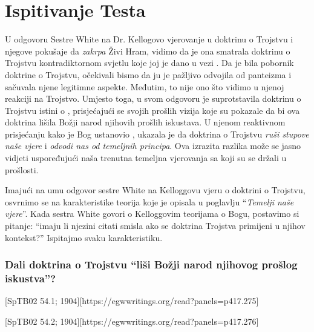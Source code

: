 \chapter{Ispitivanje Testa}

U odgovoru Sestre White na Dr. Kellogovo vjerovanje u doktrinu o Trojstvu i njegove pokušaje da \textit{zakrpa} Živi Hram, vidimo da je ona smatrala doktrinu o Trojstvu kontradiktornom svjetlu koje joj je dano u vezi . Da je bila pobornik doktrine o Trojstvu, očekivali bismo da ju je pažljivo odvojila od panteizma i sačuvala njene legitimne aspekte. Međutim, to nije ono što vidimo u njenoj reakciji na Trojstvo. Umjesto toga, u svom odgovoru je suprotstavila doktrinu o Trojstvu istini o , prisjećajući se svojih prošlih vizija koje su pokazale da bi ova doktrina lišila Božji narod njihovih prošlih iskustava. U njenom reaktivnom prisjećanju kako je Bog ustanovio , ukazala je da doktrina o Trojstvu \textit{ruši stupove naše vjere} i \textit{odvodi nas od temeljnih principa}. Ova izrazita razlika može se jasno vidjeti uspoređujući naša trenutna temeljna vjerovanja sa  koji su se držali u prošlosti.

Imajući na umu odgovor sestre White na Kelloggovu vjeru o doktrini o Trojstvu, osvrnimo se na karakteristike teorija koje je opisala u poglavlju “\textit{Temelji naše vjere}”. Kada sestra White govori o Kelloggovim teorijama o Bogu, postavimo si pitanje: “imaju li njezini citati smisla ako se doktrina Trojstva primijeni u njihov kontekst?” Ispitajmo svaku karakteristiku.

\subsection*{Dali doktrina o Trojstvu “liši Božji narod njihovog prošlog iskustva”?}

[SpTB02 54.1; 1904][https://egwwritings.org/read?panels=p417.275]

[SpTB02 54.2; 1904][https://egwwritings.org/read?panels=p417.276]


